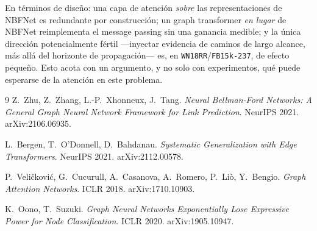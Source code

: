 \documentclass[11pt]{article}
\theoremstyle{plain}
\theoremstyle{definition}
\begin{document}
\noindent
En términos de diseño: una capa de atención \emph{sobre} las representaciones de NBFNet es redundante
por construcción; un graph transformer \emph{en lugar} de NBFNet reimplementa el message passing sin
una ganancia medible; y la única dirección potencialmente fértil ---inyectar evidencia de caminos de
largo alcance, más allá del horizonte de propagación--- es, en \texttt{WN18RR}/\texttt{FB15k-237}, de
efecto pequeño. Esto acota con un argumento, y no solo con experimentos, qué puede esperarse de la
atención en este problema.

\begin{thebibliography}{9}
Z.~Zhu, Z.~Zhang, L.-P.~Xhonneux, J.~Tang.
\emph{Neural Bellman-Ford Networks: A General Graph Neural Network Framework for Link Prediction}.
NeurIPS 2021. arXiv:2106.06935.

L.~Bergen, T.~O'Donnell, D.~Bahdanau.
\emph{Systematic Generalization with Edge Transformers}.
NeurIPS 2021. arXiv:2112.00578.

P.~Veli\v{c}kovi\'c, G.~Cucurull, A.~Casanova, A.~Romero, P.~Li\`o, Y.~Bengio.
\emph{Graph Attention Networks}. ICLR 2018. arXiv:1710.10903.

K.~Oono, T.~Suzuki.
\emph{Graph Neural Networks Exponentially Lose Expressive Power for Node Classification}.
ICLR 2020. arXiv:1905.10947.
\end{thebibliography}
\end{document}
